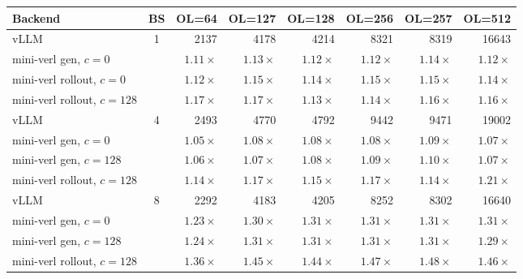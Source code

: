 \begin{table}[htbp]
    \centering
    \small
    \begin{adjustbox}{max width=\textwidth}
    \begin{tabular}{lcrrrrrr}
        \toprule
        \textbf{Backend} & \textbf{BS} &
        \textbf{OL=64} & \textbf{OL=127} & \textbf{OL=128} &
        \textbf{OL=256} & \textbf{OL=257} & \textbf{OL=512} \\
        \midrule
        vLLM                         & 1 & 2137 & 4178 & 4214 & 8321 & 8319 & 16643 \\
        mini-verl gen, $c{=}0$       &   & $1.11{\times}$ & $1.13{\times}$ & $1.12{\times}$ & $1.12{\times}$ & $1.14{\times}$ & $1.12{\times}$ \\
        mini-verl rollout, $c{=}0$   &   & $1.12{\times}$ & $1.15{\times}$ & $1.14{\times}$ & $1.15{\times}$ & $1.15{\times}$ & $1.14{\times}$ \\
        mini-verl rollout, $c{=}128$ &   & $1.17{\times}$ & $1.17{\times}$ & $1.13{\times}$ & $1.14{\times}$ & $1.16{\times}$ & $1.16{\times}$ \\
        \midrule
        vLLM                         & 4 & 2493 & 4770 & 4792 & 9442 & 9471 & 19002 \\
        mini-verl gen, $c{=}0$       &   & $1.05{\times}$ & $1.08{\times}$ & $1.08{\times}$ & $1.08{\times}$ & $1.09{\times}$ & $1.07{\times}$ \\
        mini-verl gen, $c{=}128$     &   & $1.06{\times}$ & $1.07{\times}$ & $1.08{\times}$ & $1.09{\times}$ & $1.10{\times}$ & $1.07{\times}$ \\
        mini-verl rollout, $c{=}128$ &   & $1.14{\times}$ & $1.17{\times}$ & $1.15{\times}$ & $1.17{\times}$ & $1.14{\times}$ & $1.21{\times}$ \\
        \midrule
        vLLM                         & 8 & 2292 & 4183 & 4205 & 8252 & 8302 & 16640 \\
        mini-verl gen, $c{=}0$       &   & $1.23{\times}$ & $1.30{\times}$ & $1.31{\times}$ & $1.31{\times}$ & $1.31{\times}$ & $1.31{\times}$ \\
        mini-verl gen, $c{=}128$     &   & $1.24{\times}$ & $1.31{\times}$ & $1.31{\times}$ & $1.31{\times}$ & $1.31{\times}$ & $1.29{\times}$ \\
        mini-verl rollout, $c{=}128$ &   & $1.36{\times}$ & $1.45{\times}$ & $1.44{\times}$ & $1.47{\times}$ & $1.48{\times}$ & $1.46{\times}$ \\

\end{tabular}
\end{adjustbox}
\end{table}
